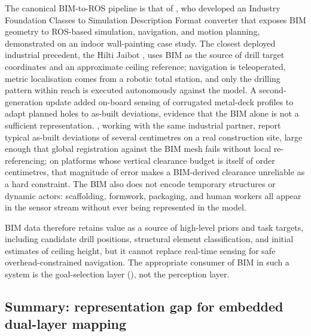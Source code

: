 \documentclass[11pt,a4paper]{article}
\begin{document}
The canonical BIM-to-ROS pipeline is that of \citet{kimDevelopmentBIMintegratedConstruction2021}, who developed an Industry Foundation Classes to Simulation Description Format converter that exposes BIM geometry to ROS-based simulation, navigation, and motion planning, demonstrated on an indoor wall-painting case study. The closest deployed industrial precedent, the Hilti Jaibot \citep{hilti2020jaibot}, uses BIM as the source of drill target coordinates and an approximate ceiling reference; navigation is teleoperated, metric localisation comes from a robotic total station, and only the drilling pattern within reach is executed autonomously against the model. A second-generation update added on-board sensing of corrugated metal-deck profiles to adapt planned holes to as-built deviations, evidence that the BIM alone is not a sufficient representation. \citet{blum2020}, working with the same industrial partner, report typical as-built deviations of several centimetres on a real construction site, large enough that global registration against the BIM mesh fails without local re-referencing; on platforms whose vertical clearance budget is itself of order centimetres, that magnitude of error makes a BIM-derived clearance unreliable as a hard constraint. The BIM also does not encode temporary structures or dynamic actors: scaffolding, formwork, packaging, and human workers all appear in the sensor stream without ever being represented in the model.

BIM data therefore retains value as a source of high-level priors and task targets, including candidate drill positions, structural element classification, and initial estimates of ceiling height, but it cannot replace real-time sensing for safe overhead-constrained navigation. The appropriate consumer of BIM in such a system is the goal-selection layer (), not the perception layer.

\subsection{Summary: representation gap for embedded dual-layer mapping}
\label{sec:sq1:discussion}
\end{document}
